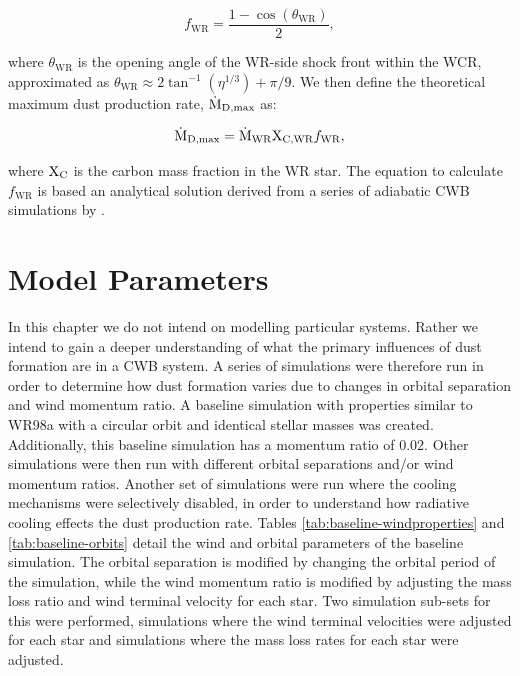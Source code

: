 \documentclass[fleqn,usenatbib]{mnras}
\begin{document}
\begin{equation}
	f_\text{WR} = \frac{1 - \cos \left(\theta_\text{WR}\right)}{2} ,
\end{equation}

\noindent
where $\theta_\text{WR}$ is the opening angle of the WR-side shock front within the WCR, approximated as $\theta_\text{WR} \approx 2 \tan^{-1} ( \eta^{1/3} ) + \pi/9$.
We then define the theoretical maximum dust production rate, $\dot{\text M}_\text{D,max}$ as:

\begin{equation}
	\dot{\text{M}}_\text{D,max} = \dot{\text{M}}_\text{WR} \text X_\text{C,WR} f_\text{WR},
\end{equation}

\noindent
 where $\text X_\text{C}$ is the carbon mass fraction in the WR star.
 The equation to calculate $f_\text{WR}$ is based an analytical solution derived from a series of adiabatic CWB simulations by  \cite{pittardCollidingStellarWinds2018}.


\section{Model Parameters}

In this chapter we do not intend on modelling particular systems.
Rather we intend to gain a deeper understanding of what the primary influences of dust formation are in a CWB system.
A series of simulations were therefore run in order to determine how dust formation varies due to changes in orbital separation and wind momentum ratio.
A baseline simulation with properties similar to WR98a with a circular orbit and identical stellar masses was created.
Additionally, this baseline simulation has a momentum ratio of $0.02$.
Other simulations were then run with different orbital separations and/or wind momentum ratios.
Another set of simulations were run where the cooling mechanisms were selectively disabled, in order to understand how radiative cooling effects the dust production rate.
Tables \ref{tab:baseline-windproperties} and \ref{tab:baseline-orbits} detail the wind and orbital parameters of the baseline simulation.
The orbital separation is modified by changing the orbital period of the simulation, while the wind momentum ratio is modified by adjusting the mass loss ratio and wind terminal velocity for each star.
Two simulation sub-sets for this were performed, simulations where the wind terminal velocities were adjusted for each star and simulations where the mass loss rates for each star were adjusted.
\end{document}
